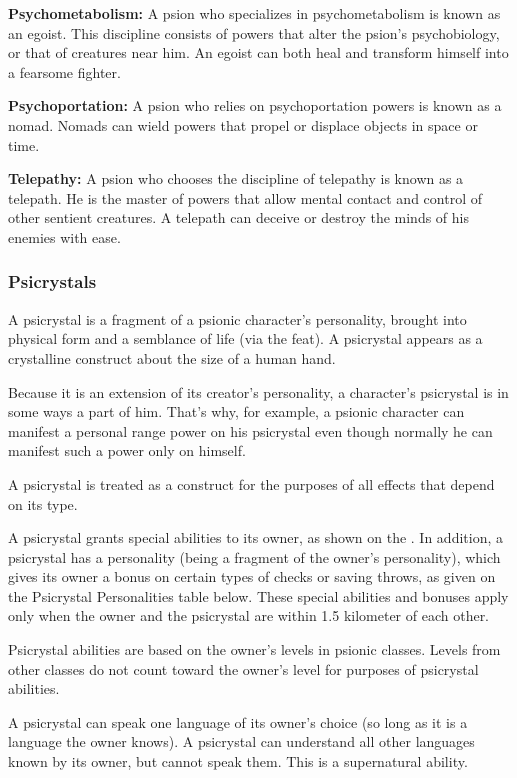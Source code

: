 \textbf{Psychometabolism:} A psion who specializes in psychometabolism is known as an egoist. This discipline consists of powers that alter the psion's psychobiology, or that of creatures near him. An egoist can both heal and transform himself into a fearsome fighter.

\textbf{Psychoportation:} A psion who relies on psychoportation powers is known as a nomad. Nomads can wield powers that propel or displace objects in space or time.

\textbf{Telepathy:} A psion who chooses the discipline of telepathy is known as a telepath. He is the master of powers that allow mental contact and control of other sentient creatures. A telepath can deceive or destroy the minds of his enemies with ease.

\subsubsection{Psicrystals}


A psicrystal is a fragment of a psionic character's personality, brought into physical form and a semblance of life (via the  feat). A psicrystal appears as a crystalline construct about the size of a human hand.

Because it is an extension of its creator's personality, a character's psicrystal is in some ways a part of him. That's why, for example, a psionic character can manifest a personal range power on his psicrystal even though normally he can manifest such a power only on himself.

A psicrystal is treated as a construct for the purposes of all effects that depend on its type.

A psicrystal grants special abilities to its owner, as shown on the . In addition, a psicrystal has a personality (being a fragment of the owner's personality), which gives its owner a bonus on certain types of checks or saving throws, as given on the Psicrystal Personalities table below. These special abilities and bonuses apply only when the owner and the psicrystal are within 1.5 kilometer of each other.

Psicrystal abilities are based on the owner's levels in psionic classes. Levels from other classes do not count toward the owner's level for purposes of psicrystal abilities.

A psicrystal can speak one language of its owner's choice (so long as it is a language the owner knows). A psicrystal can understand all other languages known by its owner, but cannot speak them. This is a supernatural ability.

